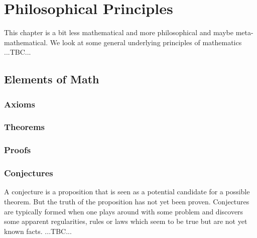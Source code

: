\chapter{Philosophical Principles}
This chapter is a bit less mathematical and more philosophical and maybe meta-mathematical. We look at some general underlying principles of mathematics ...TBC...



\section{Elements of Math}


\subsection{Axioms}

\subsection{Theorems}

\subsection{Proofs}


\subsection{Conjectures}
A conjecture is a proposition that is seen as a potential candidate for a possible theorem. But the truth of the proposition has not yet been proven. Conjectures are typically formed when one plays around with some problem and discovers some apparent regularities, rules or laws which seem to be true but are not yet known facts.  ...TBC...

